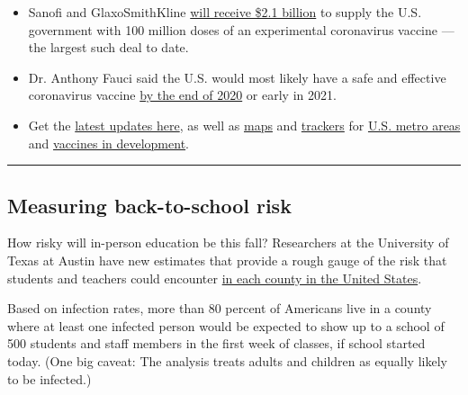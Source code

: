 \begin{itemize}
\item
  Sanofi and GlaxoSmithKline
  \href{https://www.nytimes.com/2020/07/31/health/covid-19-vaccine-sanofi-gsk.html}{will
  receive \$2.1 billion} to supply the U.S. government with 100 million
  doses of an experimental coronavirus vaccine --- the largest such deal
  to date.
\item
  Dr. Anthony Fauci said the U.S. would most likely have a safe and
  effective coronavirus vaccine
  \href{https://www.nytimes.com/2020/07/31/world/coronavirus-covid-19.html?action=click\&module=Top\%20Stories\&pgtype=Homepage\#link-4fab537}{by
  the end of 2020} or early in 2021.
\item
  Get the \href{https://www.nytimes.com/news-event/coronavirus}{latest
  updates here}, as well as
  \href{https://www.nytimes.com/interactive/2020/world/asia/china-wuhan-coronavirus-maps.html?action=click\&pgtype=Article\&state=default\&module=styln-coronavirus\&variant=show\&region=TOP_BANNER\&context=storyline_menu}{maps}
  and
  \href{https://www.nytimes.com/interactive/2020/04/03/upshot/coronavirus-metro-area-tracker.html}{trackers}
  for
  \href{https://www.nytimes.com/interactive/2020/04/03/upshot/coronavirus-metro-area-tracker.html}{U.S.
  metro areas} and
  \href{https://www.nytimes.com/interactive/2020/science/coronavirus-vaccine-tracker.html}{vaccines
  in development}.
\end{itemize}

\begin{center}\rule{0.5\linewidth}{\linethickness}\end{center}

\hypertarget{measuring-back-to-school-risk}{%
\subsection{Measuring back-to-school
risk}\label{measuring-back-to-school-risk}}

How risky will in-person education be this fall? Researchers at the
University of Texas at Austin have new estimates that provide a rough
gauge of the risk that students and teachers could encounter
\href{https://www.nytimes.com/interactive/2020/07/31/us/coronavirus-school-reopening-risk.html}{in
each county in the United States}.

Based on infection rates, more than 80 percent of Americans live in a
county where at least one infected person would be expected to show up
to a school of 500 students and staff members in the first week of
classes, if school started today. (One big caveat: The analysis treats
adults and children as equally likely to be infected.)

